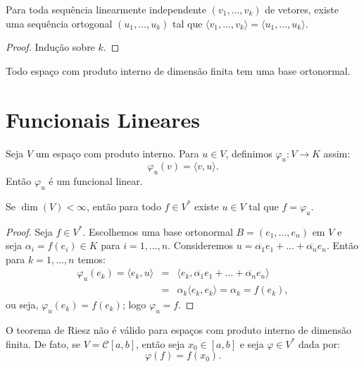 \documentclass[11pt,twoside,a4paper]{book}
\begin{document}
\begin{proposicao}
Para toda sequência linearmente independente $(v_1,\dots,v_k)$ de vetores, existe uma sequência ortogonal $(u_1,\dots,u_k)$ tal que $\langle v_1,\dots,v_k\rangle=\langle u_1,\dots,u_k\rangle$.
\end{proposicao}
\begin{proof}
Indução sobre $k$.
\end{proof}

\begin{corolario}
Todo espaço com produto interno de dimensão finita tem uma base ortonormal.
\end{corolario}

\section{Funcionais Lineares}

\begin{proposicao}
Seja $V$ um espaço com produto interno. Para $u\in V$, definimos $\varphi_u:V\rightarrow K$ assim:
\[
\varphi_u(v)=\langle v,u\rangle.
\]
Então $\varphi_u$ é um funcional linear.
\end{proposicao}

\begin{teorema}
Se $\dim(V)<\infty$, então para todo $f\in V^*$ existe $u\in V$ tal que $f=\varphi_u$.
\end{teorema}
\begin{proof}
Seja $f\in V^*$. Escolhemos uma base ortonormal $B=(e_1,\dots,e_n)$ em $V$ e seja $\alpha_i=f(e_i)\in K$ para $i=1,\dots,n$. Consideremos $u=\overline{\alpha_1}e_1+\dots+\overline{\alpha_n}e_n.$ Então para $k=1,\dots,n$ temos:
\[
\begin{array}{rcl}
\varphi_u(e_k)=\langle e_k,u\rangle&=&\langle e_k,\overline{\alpha_1}e_1+\dots+\overline{\alpha_n}e_n\rangle\\
&=&\alpha_k\langle e_k,e_k\rangle=\alpha_k=f(e_k),
\end{array}
\]
ou seja, $\varphi_u(e_k)=f(e_k)$; logo $\varphi_u=f$.
\end{proof}

\begin{observacao}
O teorema de Riesz não é válido para espaços com produto interno de dimensão finita. De fato, se $V=\mathcal{C}[a,b]$, então seja $x_0\in[a,b]$ e seja $\varphi\in V^*$ dada por:
\[
\varphi(f)=f(x_0).
\]
\end{observacao}
\end{document}
